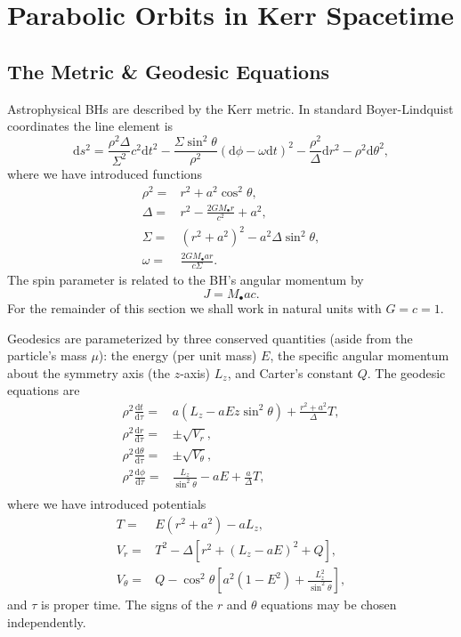 \documentclass[a4paper, 11pt, titlepage, twoside]{report}
\newcommand{\dd}{\ensuremath{\mathrm{d}}}
\newcommand{\diff}[2]{\ensuremath{\frac{\dd {#1}}{\dd {#2}}}}
\begin{document}
{\section{Parabolic Orbits in Kerr Spacetime}

\subsection{The Metric \& Geodesic Equations}

Astrophysical BHs are described by the Kerr metric\cite{Kerr1963}. In standard Boyer-Lindquist coordinates the line element is\cite{Boyer1967, Hobson2006}
\begin{equation}
\dd s^2 = \frac{\rho^2 \Delta}{\Sigma^2}c^2\dd t^2 - \frac{\Sigma \sin^2 \theta}{\rho^2}\left(\dd \phi - \omega \dd t\right)^2 - \frac{\rho^2}{\Delta}\dd r^2 - \rho^2\dd \theta^2,
\end{equation}
where we have introduced functions
\begin{align}
\rho^2 = {} & r^2 + a^2\cos^2\theta,\\
\Delta = {} & r^2 - \frac{2GM_\bullet r}{c^2} + a^2,\\
\Sigma = {} & \left(r^2 +a^2\right)^2 - a^2\Delta\sin^2\theta,\\
\omega = {} & \frac{2GM_\bullet ar}{c\Sigma}.
\end{align}
The spin parameter is related to the BH's angular momentum by
\begin{equation}
J = M_\bullet ac.
\end{equation}
For the remainder of this section we shall work in natural units with $G = c = 1$.

Geodesics are parameterized by three conserved quantities (aside from the particle's mass $\mu$): the energy (per unit mass) $E$, the specific angular momentum about the symmetry axis (the $z$-axis) $L_z$, and Carter's constant $Q$\cite{Carter1968, Chandrasekhar1998}. The geodesic equations are
\begin{align}
\rho^2 \diff{t}{\tau} = {} & a\left(L_z - aE z\sin^2 \theta\right) + \frac{r^2 + a^2}{\Delta}T,\\
\rho^2 \diff{r}{\tau} = {} & \pm \sqrt{V_r},\\
\rho^2 \diff{\theta}{\tau} = {} & \pm \sqrt{V_\theta},\\
\rho^2 \diff{\phi}{\tau} = {} & \frac{L_z}{\sin^2 \theta} - aE + \frac{a}{\Delta}T,\\
\end{align}
where we have introduced potentials
\begin{align}
T = {} & E\left(r^2 +a^2\right) - aL_z,\\
V_r = {} & T^2 - \Delta\left[r^2 + \left(L_z -aE\right)^2 + Q\right],\\
V_\theta = {} & Q - \cos^2 \theta\left[a^2\left(1 - E^2\right) + \frac{L_z^2}{\sin^2\theta}\right],
\end{align}
and $\tau$ is proper time. The signs of the $r$ and $\theta$ equations may be chosen independently.

}
\end{document}
